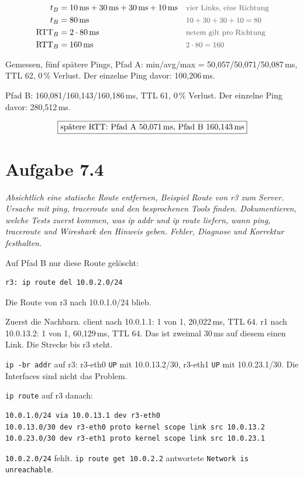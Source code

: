 \documentclass[a4paper,11pt]{article}
\newif\ifexplain
\newcommand{\aufgabe}[1]{\section*{Aufgabe #1}}
\newcommand{\angabe}[1]{{\raggedright\textit{#1}\par}\smallskip}
\newcommand{\why}[1]{\text{\small\color{black!65}#1}}
\newcommand{\explain}[1]{\ifexplain\begin{erklbox}#1\end{erklbox}\fi}
\begin{document}
\begin{align*}
t_{B} &= 10\,\mathrm{ms}+30\,\mathrm{ms}+30\,\mathrm{ms}+10\,\mathrm{ms} && \why{vier Links, eine Richtung}\\
t_{B} &= 80\,\mathrm{ms} && \why{$10+30+30+10=80$}\\
\mathrm{RTT}_{B} &= 2\cdot 80\,\mathrm{ms} && \why{netem gilt pro Richtung}\\
\mathrm{RTT}_{B} &= 160\,\mathrm{ms} && \why{$2\cdot 80=160$}
\end{align*}

Gemessen, fünf spätere Pings, Pfad A: min/avg/max = 50,057/50,071/50,087\,ms, TTL 62, 0\,\% Verlust. Der einzelne Ping davor: 100,206\,ms.

Pfad B: 160,081/160,143/160,186\,ms, TTL 61, 0\,\% Verlust. Der einzelne Ping davor: 280,512\,ms.

\explain{Die Angabe nennt 5\,ms und 30\,ms. Wer nur diese beiden Zahlen addiert, landet bei 35\,ms und trifft keine der Messungen. Ping zählt Hin- und Rückweg. Die gemeinsamen 10-ms-Links stecken in beiden Pfaden. Pfad B hat zwei Links mit 30\,ms. Das erste Paket wartet zusätzlich auf ARP, das in der Linksumme nicht vorkommt. Die späteren Pakete liegen nah an 50\,ms bzw. 160\,ms, das erste nicht.}

\[
\boxed{\text{spätere RTT: Pfad A 50,071\,ms, Pfad B 160,143\,ms}}
\]

\aufgabe{7.4}
\angabe{Absichtlich eine statische Route entfernen, Beispiel Route von r3 zum Server. Ursache mit ping, traceroute und den besprochenen Tools finden. Dokumentieren, welche Tests zuerst kommen, was ip addr und ip route liefern, wann ping, traceroute und Wireshark den Hinweis geben. Fehler, Diagnose und Korrektur festhalten.}

Auf Pfad B nur diese Route gelöscht:
\begin{lstlisting}
r3: ip route del 10.0.2.0/24
\end{lstlisting}
Die Route von r3 nach 10.0.1.0/24 blieb.

Zuerst die Nachbarn. client nach 10.0.1.1: 1 von 1, 20,022\,ms, TTL 64. r1 nach 10.0.13.2: 1 von 1, 60,129\,ms, TTL 64. Das ist zweimal 30\,ms auf diesem einen Link. Die Strecke bis r3 steht.

\texttt{ip -br addr} auf r3: r3-eth0 \texttt{UP} mit 10.0.13.2/30, r3-eth1 \texttt{UP} mit 10.0.23.1/30. Die Interfaces sind nicht das Problem.

\texttt{ip route} auf r3 danach:
\begin{lstlisting}
10.0.1.0/24 via 10.0.13.1 dev r3-eth0
10.0.13.0/30 dev r3-eth0 proto kernel scope link src 10.0.13.2
10.0.23.0/30 dev r3-eth1 proto kernel scope link src 10.0.23.1
\end{lstlisting}
\texttt{10.0.2.0/24} fehlt. \texttt{ip route get 10.0.2.2} antwortete \texttt{Network is unreachable}.
\end{document}

